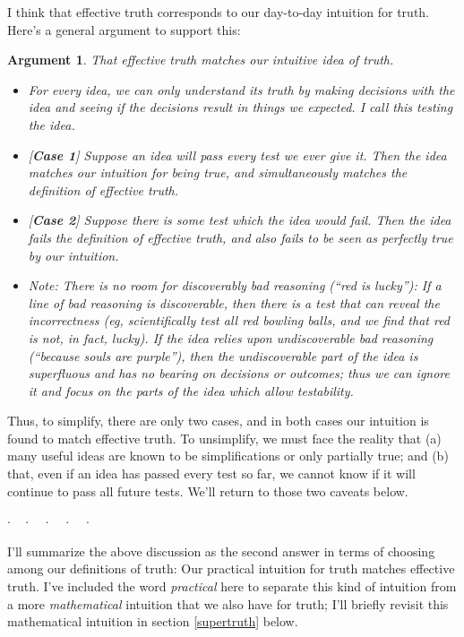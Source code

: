 \documentclass[11pt, oneside]{article}
\newenvironment{answerwnum}[1]
  {\renewcommand\theinnercustomthm{#1}\innercustomthm}
  {\endinnercustomthm}
\newtheorem*{argt}{Argument}
\newcommand{\dotq}{\cdot\quad}
\newcommand{\scenebreak}{
    \medskip\centerline{$\dotq\dotq\dotq\dotq\cdot$}\medskip
}
\begin{document}
I think that effective truth corresponds to our day-to-day intuition for truth.
Here's a general argument to support this:
\begin{argt} That effective truth matches our intuitive idea of truth.
    \normalfont
\begin{itemize}
    \item For every idea, we can only understand its truth by making decisions
        with the idea and seeing if the decisions result in things we expected.
        I call this {\em testing the idea.}
    \item{} [{\bf Case 1}]
        Suppose an idea will pass every test we ever give it. Then
        the idea
        matches our intuition for being true, and simultaneously matches the
        definition of effective truth.
    \item{} [{\bf Case 2}]
        Suppose there is some test which the idea would fail.
        Then the idea fails the definition of
        effective truth, and also fails to be seen as perfectly true by our
        intuition.
    \item{}
        {\em Note:} There is no room for discoverably
        bad reasoning (``red is lucky''):
        If a line of bad reasoning is discoverable,
        then there is a test that can reveal the incorrectness
        (eg, scientifically test all red bowling balls, and we find that red is
        not, in fact, lucky).
        If the idea
        relies upon undiscoverable bad reasoning (``because souls are purple''),
        then the undiscoverable part of the idea is superfluous and has no
        bearing on decisions or outcomes; thus we can ignore it and focus on the
        parts of the idea which allow testability.
\end{itemize}
\end{argt}
Thus, to simplify, there are only two cases, and in both cases our intuition is
found to match effective truth. To unsimplify, we must face the reality that (a)
many useful ideas are known to be simplifications or only partially true; and
(b) that, even if an idea has passed every test so far, we cannot know if it
will continue to pass all future tests.
We'll return to those two caveats below.

\scenebreak

I'll summarize the above discussion as the second answer in terms
of choosing among our definitions of truth:
\begin{answerwnum}{B}
    Our practical intuition for truth matches effective truth.
\end{answerwnum}
I've included the word {\em practical} here to separate this kind of intuition
from a more {\em mathematical} intuition that we also have for truth;
I'll briefly revisit this mathematical intuition in section \ref{supertruth}
below.
\end{document}
